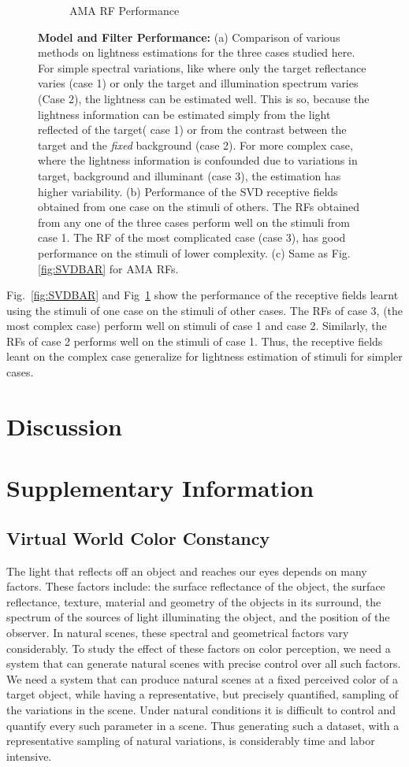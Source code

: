 \documentclass{jov}
\begin{document}
\begin{figure}
\begin{subfigure}{0.3 \textwidth}
	\caption{AMA RF Performance}
	\label{fig:AMABAR}
    \end{subfigure}
\caption{{\bf Model and Filter Performance:} (a) Comparison of various methods on lightness estimations for the three cases studied here. For simple spectral variations, like where only the target reflectance varies (case 1) or only the target and illumination spectrum varies (Case 2), the lightness can be estimated well. This is so, because the lightness information can be estimated simply from the light reflected of the target( case 1) or from the contrast between the target and the {\it fixed} background (case 2). For more complex case, where the lightness information is confounded due to variations in target, background and illuminant (case 3), the estimation has higher variability. (b) Performance of the SVD receptive fields obtained from one case on the stimuli of others. The RFs obtained from any one of the three cases perform well on the stimuli from case 1. The RF of the most complicated case (case 3), has good performance on the stimuli of lower complexity. (c) Same as Fig.\ref{fig:SVDBAR} for AMA RFs.}
 \label{fig:barGraphs}
\end{figure}
Fig.~\ref{fig:SVDBAR} and Fig~\ref{fig:AMABAR} show the performance of the receptive fields learnt using the stimuli of one case on the stimuli of other cases. The RFs of case 3, (the most complex case) perform well on stimuli of case 1 and case 2.  Similarly, the RFs of case 2 performs well on the stimuli of case 1. Thus, the receptive fields leant on the complex case generalize for lightness estimation of stimuli for simpler cases.

\section{Discussion}

\section{Supplementary Information}
\subsection{Virtual World Color Constancy}
The light that reflects off an object and reaches our eyes depends on many factors. These factors include: the surface reflectance of the object, the surface reflectance, texture, material and geometry of the objects in its surround, the spectrum of the sources of light illuminating the object, and the position of the observer. In natural scenes, these spectral and geometrical factors vary considerably. To study the effect of these factors on color perception, we need a system that can generate natural scenes with precise control over all such factors. We need a system that can produce natural scenes at a fixed perceived color of a target object, while having a representative, but precisely quantified, sampling of the variations in the scene. Under natural conditions it is difficult to control and quantify every such parameter in a scene. Thus generating such a dataset, with a representative sampling of natural variations, is considerably time and labor intensive.
\end{document}
